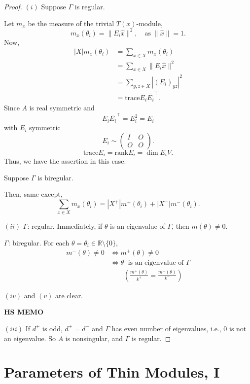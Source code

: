 \documentclass[
]{book}
\theoremstyle{definition}
\theoremstyle{definition}
\theoremstyle{definition}
\theoremstyle{definition}
\theoremstyle{remark}
\begin{document}
\begin{proof}

\((i)\) Suppose \(\Gamma\) is regular.

Let \(m_x\) be the measure of the trivial \(T(x)\)-module,
\[m_x(\theta_i) = \|E_i\hat{x}\|^2, \quad \text{as}\; \|\hat{x}\| = 1.\]
Now,
\begin{align}
|X|m_x(\theta_i) & = \sum_{x\in X}m_x(\theta_i)\\
& = \sum_{x\in X}\|E_i\hat{x}\|^2\\
& = \sum_{y,z\in X}|(E_i)_{yz}|^2\\
& = \mathrm{trace} E_i\overline{E_i}^\top.
\end{align}
Since \(A\) is real symmetric and
\[E_i\overline{E_i}^\top = E_i^2 = E_i\]
with \(E_i\) symmetric
\[E_i \sim \begin{pmatrix} I & O \\ O & O\end{pmatrix}.\]
\[\mathrm{trace} E_i = \mathrm{rank} E_i = \dim E_iV.\]
Thus, we have the assertion in this case.

Suppose \(\Gamma\) is biregular.

Then, same except,
\[\sum_{x\in X} m_x(\theta_i) = |X^+|m^+(\theta_i) + |X^-|m^-(\theta_i).\]

\((ii)\)
\(\Gamma\): regular. Immediately, if \(\theta\) is an eigenvalue of \(\Gamma\), then \(m(\theta) \neq 0\).

\(\Gamma\): biregular. For each \(\theta = \theta_i \in \mathbb{R}\setminus\{0\}\),
\begin{align}
m^-(\theta) \neq 0 &\Leftrightarrow m^+(\theta) \neq 0\\
& \Leftrightarrow \theta \; \text{ is an eigenvalue of $\Gamma$}\\
& \quad\quad \left(\frac{m^+(\theta)}{k^+} = \frac{m^-(\theta)}{k^-} \right)
\end{align}

\((iv)\) and \((v)\) are clear.

\textbf{HS MEMO}

\((iii)\) If \(d^+\) is odd, \(d^+ = d^-\) and \(\Gamma\) has even number of eigenvalues, i.e., \(0\) is not an eigenvalue.
So \(A\) is nonsingular, and \(\Gamma\) is regular.

\end{proof}

\hypertarget{lec14}{%
\chapter{Parameters of Thin Modules, I}\label{lec14}}
\end{document}
